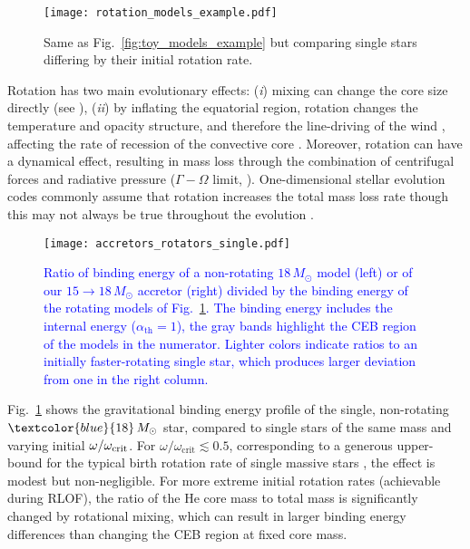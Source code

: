 \documentclass[twocolumn,twocolappendix,trackchanges]{aastex63}
\DeclareRobustCommand{\Figref}[1]{Fig.~\ref{#1}}
\begin{document}
\begin{figure}[htbp]
  \centering
  \texttt{[image: rotation\_models\_example.pdf]}
  \caption{Same as \Figref{fig:toy_models_example} but comparing
    single stars differing by their initial rotation rate.}
  \label{fig:rotation_models_example}
\end{figure}

Rotation has two main evolutionary effects: (\emph{i}) mixing can change the core
size directly (see \citealt{heger:2000, maeder:00}), (\emph{ii}) by
inflating the equatorial region, rotation changes the temperature and
opacity structure, and therefore the line-driving of the wind
\cite[e.g.,][]{muller:2014, gagnier:2019}, affecting the
rate of recession of the convective core \citep[e.g.,][]{renzo:2017,
  renzo:2020ppi_conv}. Moreover, rotation can have a dynamical effect,
resulting in mass loss through the combination of centrifugal forces
and radiative pressure ($\Gamma-\Omega$ limit, \citealt{langer:1998}).
One-dimensional stellar evolution codes commonly assume that rotation
increases the total mass loss rate \citep[e.g.,][]{langer:1998,
  heger:2000} though this may not always be true throughout the
evolution \citep[e.g.,][]{gagnier:2019}.

\begin{figure}[!htbp]
  \centering
  \texttt{[image: accretors\_rotators\_single.pdf]}
  \caption{\textcolor{blue}{Ratio of binding energy of a non-rotating
      $18\,M_\odot$ model (left) or of our $15\rightarrow18\,M_\odot$
      accretor (right) divided by the binding energy of the rotating
      models of \Figref{fig:rotation_models_example}. The binding
      energy includes the internal energy ($\alpha_\mathrm{th}=1$),
      the gray bands highlight the CEB region of the models in the
      numerator. Lighter colors indicate ratios to an initially
      faster-rotating single star, which produces larger deviation
      from one in the right column.}}
  \label{fig:accretors_rotators_single}
\end{figure}


\Figref{fig:rotation_models_example} shows the gravitational binding
energy profile of the single, non-rotating
$\textcolor{blue}{18}\,M_\odot$ star, compared to single stars of the
same mass and varying initial $\omega/\omega_{\rm crit}$.  For
$\omega/\omega_\mathrm{crit}\lesssim 0.5$, corresponding to a generous
upper-bound for the typical birth rotation rate of single massive
stars \citep[e.g.,][]{ramirez-agudelo:2015}, the effect is modest but
non-negligible. For more extreme initial rotation rates (achievable
during RLOF), the ratio of the He core mass to total mass is
significantly changed by rotational mixing, which can result in larger
binding energy differences than changing the CEB region at fixed core
mass.
\end{document}
